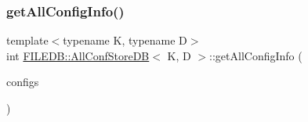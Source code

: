 \subsubsection{\texorpdfstring{getAllConfigInfo()}{getAllConfigInfo()}\hspace{0.1cm}{\footnotesize\ttfamily [2/2]}}
{\footnotesize\ttfamily template$<$typename K, typename D$>$ \\
int \mbox{\hyperlink{classFILEDB_1_1AllConfStoreDB}{F\+I\+L\+E\+D\+B\+::\+All\+Conf\+Store\+DB}}$<$ K, D $>$\+::get\+All\+Config\+Info (\begin{DoxyParamCaption}\item[{std\+::vector$<$ \mbox{\hyperlink{classFILEDB_1_1ConfigInfo}{Config\+Info}} $>$ \&}]{configs }\end{DoxyParamCaption})\hspace{0.3cm}{\ttfamily [inline]}}

